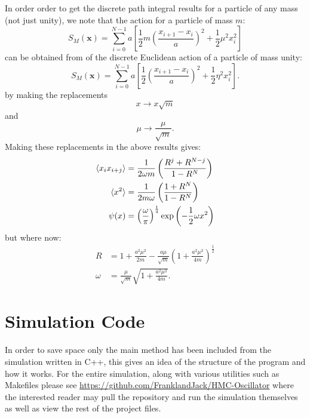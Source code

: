 \documentclass[12pt]{article}
\begin{document}
        In order order to get the discrete path integral results for a particle of any mass (not just unity), we note that the action for a particle of mass $m$:
        \begin{equation}
            \label{eq:ActionMassM}
            S_{M}\left(\bm{x}\right) = \sum_{i=0}^{N-1}a\left[\frac{1}{2}m\left(\frac{x_{i+1}-x_i}{a}\right)^2+\frac{1}{2}\mu^2 x_i^2\right]
        \end{equation}
        can be obtained from of the discrete Euclidean action of a particle of mass unity:
        \begin{equation}
            \label{eq:ActionMassUnity}
            S_{M}\left(\bm{x}\right) = \sum_{i=0}^{N-1}a\left[\frac{1}{2}\left(\frac{x_{i+1}-x_i}{a}\right)^2+\frac{1}{2}\eta^2x_i^2\right].
        \end{equation}
        by making the replacements
        \begin{equation}
            \label{eq:XRescaling}
            x\rightarrow x\sqrt{m}
        \end{equation}
        and
        \begin{equation}
            \label{eq:MuRescaling} 
            \mu \rightarrow \frac{\mu}{\sqrt{m}}. 
        \end{equation}
        Making these replacements in the above results gives:
        \begin{align}
            \braket{x_ix_{i+j}} & = \frac{1}{2\omega m}\left(\frac{R^j+R^{N-j}}{1-R^N}\right) \\
            \braket{x^2} & =\frac{1}{2m\omega}\left(\frac{1+R^N}{1-R^N}\right) \\
            \psi(x) & = \left(\frac{\omega}{\pi}\right)^\frac{1}{4}\exp\left(-\frac{1}{2}\omega x^2\right)
        \end{align}
        but where now:
        \begin{align}
            R & = 1 + \frac{a^2\mu^2}{2m}-\frac{a\mu}{\sqrt{m}}\left(1+\frac{a^2\mu^2}{4m}\right)^\frac{1}{2}\\
            \omega & = \frac{\mu}{\sqrt{m}}\sqrt{1+\frac{a^2\mu^2}{4m}}.
        \end{align}

\section{Simulation Code}
    \label{ap:simulation code}
    In order to save space only the main method has been included from the simulation written in C++, this gives an idea of the structure of the program and how it works. For the entire simulation, along with various utilities such as Makefiles please see \url{https://github.com/FranklandJack/HMC-Oscillator} where the interested reader may pull the repository and run the simulation themselves as well as view the rest of the project files.
    
\end{document}
